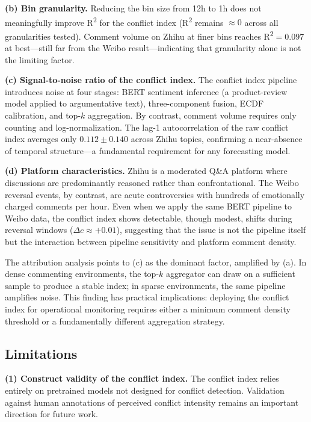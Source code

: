 \documentclass[journal]{IEEEtran}
\begin{document}
\textbf{(b) Bin granularity.} Reducing the bin size from 12h to 1h does not meaningfully improve R\textsuperscript{2} for the conflict index (R\textsuperscript{2} remains $\approx 0$ across all granularities tested). Comment volume on Zhihu at finer bins reaches R\textsuperscript{2}$=0.097$ at best---still far from the Weibo result---indicating that granularity alone is not the limiting factor.

\textbf{(c) Signal-to-noise ratio of the conflict index.} The conflict index pipeline introduces noise at four stages: BERT sentiment inference (a product-review model applied to argumentative text), three-component fusion, ECDF calibration, and top-$k$ aggregation. By contrast, comment volume requires only counting and log-normalization. The lag-1 autocorrelation of the raw conflict index averages only $0.112 \pm 0.140$ across Zhihu topics, confirming a near-absence of temporal structure---a fundamental requirement for any forecasting model.

\textbf{(d) Platform characteristics.} Zhihu is a moderated Q\&A platform where discussions are predominantly reasoned rather than confrontational. The Weibo reversal events, by contrast, are acute controversies with hundreds of emotionally charged comments per hour. Even when we apply the same BERT pipeline to Weibo data, the conflict index shows detectable, though modest, shifts during reversal windows ($\Delta c \approx +0.01$), suggesting that the issue is not the pipeline itself but the interaction between pipeline sensitivity and platform comment density.

The attribution analysis points to (c) as the dominant factor, amplified by (a). In dense commenting environments, the top-$k$ aggregator can draw on a sufficient sample to produce a stable index; in sparse environments, the same pipeline amplifies noise. This finding has practical implications: deploying the conflict index for operational monitoring requires either a minimum comment density threshold or a fundamentally different aggregation strategy.

\subsection{Limitations}\label{sec:limitations}

\textbf{(1) Construct validity of the conflict index.} The conflict index relies entirely on pretrained models not designed for conflict detection. Validation against human annotations of perceived conflict intensity remains an important direction for future work.
\end{document}
